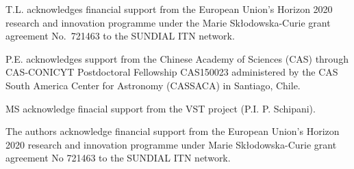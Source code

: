 \documentclass[useAMS,usenatbib]{mn2e}
\begin{document}
T.L. acknowledges financial support from the European Union's Horizon 2020 
research and innovation programme under the Marie Sk\l{}odowska-Curie 
grant agreement No.\ 721463 to the SUNDIAL ITN network.

P.E. acknowledges support from the Chinese Academy of Sciences (CAS) 
through CAS-CONICYT Postdoctoral  Fellowship CAS150023 administered 
by the CAS South America Center for Astronomy (CASSACA) in Santiago,  Chile.

MS acknowledge finacial support from the VST project (P.I. P. Schipani).

The authors acknowledge financial support from the European Union’s 
Horizon 2020 research and innovation programme under Marie Sk\l{}odowska-Curie 
grant agreement No 721463 to the SUNDIAL ITN network.



\end{document}
